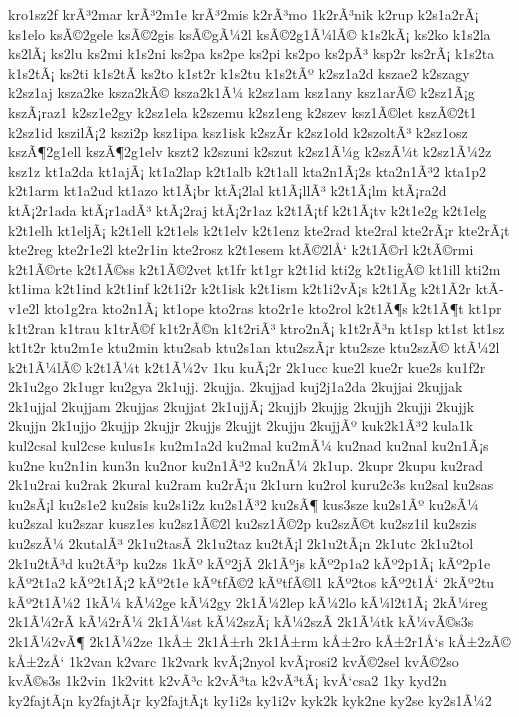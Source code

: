 {kro1sz2f
krÃ³2mar
krÃ³2m1e
krÃ³2mis
k2rÃ³mo
1k2rÃ³nik
k2rup
k2s1a2rÃ¡
ks1elo
ksÃ©2gele
ksÃ©2gis
ksÃ©gÃ¼2l
ksÃ©2g1Ã¼lÃ©
k1s2kÃ¡
ks2ko
k1s2la
ks2lÃ¡
ks2lu
ks2mi
k1s2ni
ks2pa
ks2pe
ks2pi
ks2po
ks2pÃ³
ksp2r
ks2rÃ¡
k1s2ta
k1s2tÃ¡
ks2ti
k1s2tÃ­
ks2to
k1st2r
k1s2tu
k1s2tÃº
k2sz1a2d
kszae2
k2szagy
k2sz1aj
ksza2ke
ksza2kÃ©
ksza2k1Ã¼
k2sz1am
ksz1any
ksz1arÃ©
k2sz1Ã¡g
kszÃ¡raz1
k2sz1e2gy
k2sz1ela
k2szemu
k2sz1eng
k2szev
ksz1Ã©let
kszÃ©2t1
k2sz1id
kszilÃ¡2
kszi2p
ksz1ipa
ksz1isk
k2szÃ­r
k2sz1old
k2szoltÃ³
k2sz1osz
kszÃ¶2g1ell
kszÃ¶2g1elv
kszt2
k2szuni
k2szut
k2sz1Ã¼g
k2szÃ¼t
k2sz1Ã¼2z
ksz1z
kt1a2da
kt1ajÃ¡
kt1a2lap
k2t1alb
k2t1all
kta2n1Ã¡2s
kta2n1Ã³2
kta1p2
k2t1arm
kt1a2ud
kt1azo
kt1Ã¡br
ktÃ¡2lal
kt1Ã¡llÃ³
k2t1Ã¡lm
ktÃ¡ra2d
ktÃ¡2r1ada
ktÃ¡r1adÃ³
ktÃ¡2raj
ktÃ¡2r1az
k2t1Ã¡tf
k2t1Ã¡tv
k2t1e2g
k2t1elg
k2t1elh
kt1eljÃ¡
k2t1ell
k2t1els
k2t1elv
k2t1enz
kte2rad
kte2ral
kte2rÃ¡r
kte2rÃ¡t
kte2reg
kte2r1e2l
kte2r1in
kte2rosz
k2t1esem
ktÃ©2lÅ‘
k2t1Ã©rl
k2tÃ©rmi
k2t1Ã©rte
k2t1Ã©ss
k2t1Ã©2vet
kt1fr
kt1gr
k2t1id
kti2g
k2t1igÃ©
kt1ill
kti2m
kt1ima
k2t1ind
k2t1inf
k2t1i2r
k2t1isk
k2t1ism
k2t1i2vÃ¡s
k2t1Ã­g
k2t1Ã­2r
ktÃ­v1e2l
kto1g2ra
kto2n1Ã¡
kt1ope
kto2ras
kto2r1e
kto2rol
k2t1Ã¶s
k2t1Ã¶t
kt1pr
k1t2ran
k1trau
k1trÃ©f
k1t2rÃ©n
k1t2riÃ³
ktro2nÃ¡
k1t2rÃ³n
kt1sp
kt1st
kt1sz
kt1t2r
ktu2m1e
ktu2min
ktu2sab
ktu2s1an
ktu2szÃ¡r
ktu2sze
ktu2szÃ©
ktÃ¼2l
k2t1Ã¼lÃ©
k2t1Ã¼t
k2t1Ã¼2v
1ku
kuÃ¡2r
2k1ucc
kue2l
kue2r
kue2s
ku1f2r
2k1u2go
2k1ugr
ku2gya
2k1ujj.
2kujja.
2kujjad
kuj2j1a2da
2kujjai
2kujjak
2k1ujjal
2kujjam
2kujjas
2kujjat
2k1ujjÃ¡
2kujjb
2kujjg
2kujjh
2kujji
2kujjk
2kujjn
2k1ujjo
2kujjp
2kujjr
2kujjs
2kujjt
2kujju
2kujjÃº
kuk2k1Ã³2
kula1k
kul2csal
kul2cse
kulus1s
ku2m1a2d
ku2mal
ku2mÃ¼
ku2nad
ku2nal
ku2n1Ã¡s
ku2ne
ku2n1in
kun3n
ku2nor
ku2n1Ã³2
ku2nÃ¼
2k1up.
2kupr
2kupu
ku2rad
2k1u2rai
ku2rak
2kural
ku2ram
ku2rÃ¡u
2k1urn
ku2rol
kuru2c3s
ku2sal
ku2sas
ku2sÃ¡l
ku2s1e2
ku2sis
ku2s1i2z
ku2s1Ã³2
ku2sÃ¶
kus3sze
ku2s1Ãº
ku2sÃ¼
ku2szal
ku2szar
kusz1es
ku2sz1Ã©2l
ku2sz1Ã©2p
ku2szÃ©t
ku2sz1il
ku2szis
ku2szÃ¼
2kutalÃ³
2k1u2tasÃ­
2k1u2taz
ku2tÃ¡l
2k1u2tÃ¡n
2k1utc
2k1u2tol
2k1u2tÃ³d
ku2tÃ³p
ku2zs
1kÃº
kÃº2jÃ­
2k1Ãºjs
kÃº2p1a2
kÃº2p1Ã¡
kÃº2p1e
kÃº2t1a2
kÃº2t1Ã¡2
kÃº2t1e
kÃºtfÃ©2
kÃºtfÃ©l1
kÃº2tos
kÃº2t1Å‘
2kÃº2tu
kÃº2t1Ã¼2
1kÃ¼
kÃ¼2ge
kÃ¼2gy
2k1Ã¼2lep
kÃ¼2lo
kÃ¼l2t1Ã¡
2kÃ¼reg
2k1Ã¼2rÃ­
kÃ¼2rÃ¼
2k1Ã¼st
kÃ¼2szÃ¡
kÃ¼2szÃ­
2k1Ã¼tk
kÃ¼vÃ©s3s
2k1Ã¼2vÃ¶
2k1Ã¼2ze
1kÅ±
2k1Å±rh
2k1Å±rm
kÅ±2ro
kÅ±2r1Å‘s
kÅ±2zÃ©
kÅ±2zÅ‘
1k2van
k2varc
1k2vark
kvÃ¡2nyol
kvÃ¡rosi2
kvÃ©2sel
kvÃ©2so
kvÃ©s3s
1k2vin
1k2vitt
k2vÃ³c
k2vÃ³ta
k2vÃ³tÃ¡
kvÅ‘csa2
1ky
kyd2n
ky2fajtÃ¡n
ky2fajtÃ¡r
ky2fajtÃ¡t
ky1i2s
ky1i2v
kyk2k
kyk2ne
ky2se
ky2s1Ã¼2
}
